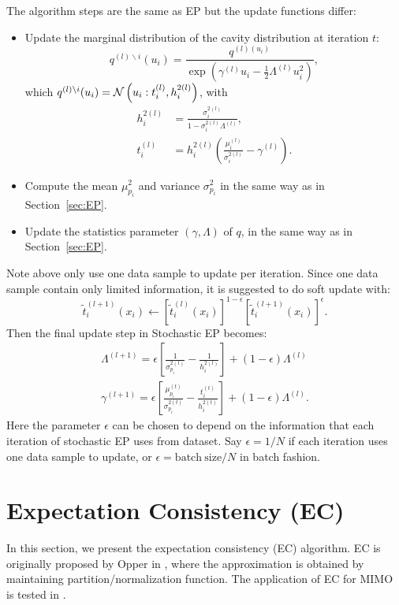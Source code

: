 \documentclass{article}
\begin{document}
The algorithm steps are the same as EP but the update functions differ:
\begin{itemize}
\item Update the marginal distribution of the cavity distribution at iteration $t$:
  \begin{equation}
    q^{(l)\backslash i}(u_i) = \frac{q^{(l)(u_i)}}{\exp\left( \gamma^{(l)}u_i - \frac{1}{2}\Lambda^{(l)}u_i^2 \right)} ,
  \end{equation}
  which $q^{(l)\backslash i}(u_i) = \mathcal{N}\left( u_i: t_i^{(l)}, h_i^{2(l)} \right)$, with
  \begin{align}
    h_i^{2 (l)} &= \frac{\sigma_i^{2 (l)}}{1-\sigma_i^{2 (l)} \Lambda^{(l)}}, \\
    t_i^{(l)} &= h_i^{2(l)}\left( \frac{\mu_i^{(l)}}{\sigma_i^{2(l)}} - {\gamma^{(l)}} \right).
  \end{align}
  

\item Compute the mean $\mu_{p_i}^2$ and variance $\sigma_{p_i}^2$ in the same way as in Section~\ref{sec:EP}.
\item Update the statistics parameter $\left( {\gamma}, {\Lambda} \right)$ of $q$, in the same way as in Section~\ref{sec:EP}.
\end{itemize}
Note above only use one data sample to update per iteration. Since one data sample contain only limited information, it is suggested to do soft update with:
\begin{equation}
  \tilde{t}^{(l+1)}_i(x_i) \gets [\tilde{t}_i^{(l)}(x_i)]^{1-\epsilon} [\tilde{t}^{(l+1)}_i(x_i)]^{\epsilon}.
\end{equation}
Then the final update step in Stochastic EP becomes:
\begin{align}
  \Lambda^{(l+1)} = \epsilon\left[ \frac{1}{\sigma_{p_i}^{2(l)}} - \frac{1}{h_i^{2(l)}}  \right] + (1- \epsilon) \Lambda^{(l)}\\
  \gamma^{(l+1)} = \epsilon \left[  \frac{\mu_{p_i}^{(t)}}{\sigma_{p_i}^{2(t)}} - \frac{t_i^{(t)}}{h_i^{2(t)}} \right] + (1 - \epsilon) \Lambda^{(l)}.
\end{align}
Here the parameter $\epsilon$ can be chosen to depend on the information that each iteration of stochastic EP uses from dataset. Say $\epsilon  = 1/N$ if each iteration uses one data sample to update, or $\epsilon = \mathrm{batch~size}/N$ in batch fashion.

\section{Expectation Consistency (EC)}\label{sec:ec}
In this section, we present the expectation consistency (EC) algorithm. EC is originally proposed by Opper in \cite{opper2005ec}, where the approximation is obtained by maintaining partition/normalization function. The application of EC for MIMO is tested in \cite{cespedes2018ecmimo}.
\end{document}
